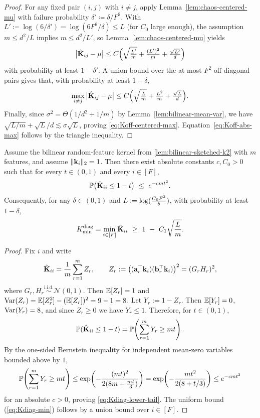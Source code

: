 \begin{proof}
For any fixed pair $(i,j)$ with $i\neq j$, apply Lemma~\ref{lem:chaos-centered-mu} with failure probability $\delta' \coloneqq \delta/F^2$.
With $L' \coloneqq \log(6/\delta') = \log(6F^2/\delta)\le L$ (for $C_{0}$ large enough), the assumption $m\le d^2/L$ implies $m \le d^2/L'$, so Lemma~\ref{lem:chaos-centered-mu} yields
\[
    \big|\hat{\mathbf{K}}_{ij}-\mu\big|
    \le
    C\Big(\sqrt{\tfrac{L'}{m}} + \tfrac{(L')^2}{m} + \tfrac{\sqrt{L'}}{d}\Big)
\]
with probability at least $1-\delta'$.
A union bound over the at most $F^2$ off-diagonal pairs gives that, with probability at least $1-\delta$,
\[
    \max_{i\neq j}\big|\hat{\mathbf{K}}_{ij}-\mu\big|
    \le
    C\Big(\sqrt{\tfrac{L}{m}} + \tfrac{L^2}{m} + \tfrac{\sqrt{L}}{d}\Big).
\]
Finally, since $\sigma^2=\Theta(1/d^2+1/m)$ by Lemma~\ref{lem:bilinear-mean-var}, we have $\sqrt{L/m}+\sqrt{L}/d \lesssim \sigma\sqrt{L}$, proving \eqref{eq:Koff-centered-max}.
Equation~\eqref{eq:Koff-abs-max} follows by the triangle inequality.
\end{proof}


\label{app:Kdiag-lower-bilinear}
\begin{lemma}
\label{lem:Kdiag-lower-bilinear}
Assume the bilinear random-feature kernel from \cref{lem:bilinear-sketched-k2} with $m$ features, and assume $\|{\mathbf{k}}_{i}\|_{2}=1$.
Then there exist absolute constants $c,C_{0}>0$ such that for every $t\in(0,1)$ and every $i\in[F]$,
\begin{equation}
\Pbb\big(\hat{\matK}_{ii}\le 1-t\big)\ \le\ e^{-c m t^2}.
\label{eq:Kdiag-lower-tail}
\end{equation}
Consequently, for any $\delta\in(0,1)$ and $L\vcentcolon= \log(\tfrac{C_{0} F^2}{\delta})$, with probability at least $1-\delta$,
\begin{equation}
K_{\min}^{\mathrm{diag}}=\min_{i\in[F]}\hat{\mathbf{K}}_{ii}
\ \ge\
1\ -\ C_{1}\sqrt{\frac{L}{m}}.
\label{eq:Kdiag-min}
\end{equation}
\end{lemma}

\begin{proof}
Fix $i$ and write
\[
\hat{\mathbf{K}}_{ii}=\frac1m\sum_{r=1}^m Z_{r},\qquad Z_{r}:=\big(({\mathbf{a}}_{r}^\top {\mathbf{k}}_{i})({\mathbf{b}}_{r}^\top {\mathbf{k}}_{i})\big)^2
=(G_rH_{r})^2,
\]
where $G_{r},H_{r}\stackrel{\text{i.i.d.}}{\sim}\mathcal N(0,1)$. Then
$\mathbb{E} [Z_{r}]=1$ and $\mathrm{Var}(Z_{r})=\mathbb{E}[Z_{r}^2]-(\mathbb{E}[Z_{r}])^2=9-1=8$.
Let $Y_{r}:=1-Z_{r}$. Then $\mathbb{E}[Y_{r}]=0$, $\mathrm{Var}(Y_{r})=8$, and since $Z_{r}\ge0$ we have $Y_{r}\le 1$. Therefore, for $t\in(0,1)$,
\[
\mathbb{P}(\hat{\mathbf{K}}_{ii}\le 1-t)
=\mathbb{P}\!\left(\sum_{r=1}^m Y_{r}\ge mt\right).
\]
By the one-sided Bernstein inequality for independent mean-zero variables bounded above by $1$,
\[
\mathbb{P}\!\left(\sum_{r=1}^m Y_{r}\ge mt\right)
\le
\exp\!\left(-\frac{(mt)^2}{2(8m+\frac{mt}{3})}\right)
=
\exp\!\left(-\frac{m t^2}{2(8+t/3)}\right)
\le
e^{-cmt^2}
\]
for an absolute $c>0$, proving \eqref{eq:Kdiag-lower-tail}.
The uniform bound (\eqref{eq:Kdiag-min}) follows by a union bound over $i\in[F]$.
\end{proof}

